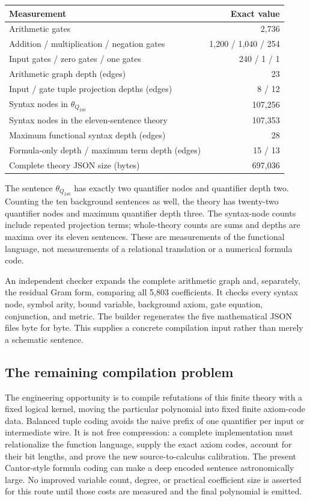\documentclass[11pt]{article}
\theoremstyle{remark}\newtheorem{remark}[theorem]{Remark}
\begin{document}
\begin{center}\small
\begin{tabular}{lr}
\toprule
Measurement & Exact value\\\midrule
Arithmetic gates & 2,736\\
Addition / multiplication / negation gates & 1,200 / 1,040 / 254\\
Input gates / zero gates / one gates & 240 / 1 / 1\\
Arithmetic graph depth (edges) & 23\\
Input / gate tuple projection depths (edges) & 8 / 12\\
Syntax nodes in $\theta_{Q_{240}}$ & 107,256\\
Syntax nodes in the eleven-sentence theory & 107,353\\
Maximum functional syntax depth (edges) & 28\\
Formula-only depth / maximum term depth (edges) & 15 / 13\\
Complete theory JSON size (bytes) & 697,036\\
\bottomrule
\end{tabular}
\end{center}

The sentence $\theta_{Q_{240}}$ has exactly two quantifier nodes and
quantifier depth two. Counting the ten background sentences as well,
the theory has twenty-two quantifier nodes and maximum quantifier
depth three. The syntax-node counts include repeated projection terms;
whole-theory counts are sums and depths are maxima over its eleven
sentences. These are measurements of the functional language, not
measurements of a relational translation or a numerical formula code.

An independent checker expands the complete arithmetic graph and,
separately, the residual Gram form, comparing all 5,803 coefficients.
It checks every syntax node, symbol arity, bound variable, background
axiom, gate equation, conjunction, and metric. The builder regenerates
the five mathematical JSON files byte for byte. This supplies a
concrete compilation input rather than merely a schematic sentence.

\subsection{The remaining compilation problem}

The engineering opportunity is to compile refutations of this finite
theory with a fixed logical kernel, moving the particular polynomial
into fixed finite axiom-code data. Balanced tuple coding avoids the naive
prefix of one quantifier per input or intermediate wire. It is not
free compression: a complete implementation must relationalize the
function language, supply the exact axiom codes, account for their
bit lengths, and prove the new source-to-calculus calibration. The
present Cantor-style formula coding can make a deep encoded sentence
astronomically large. No improved variable count, degree, or practical
coefficient size is asserted for this route until those costs are
measured and the final polynomial is emitted.
\end{document}
